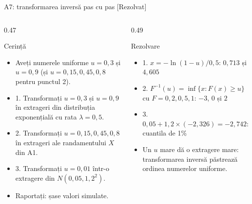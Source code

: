 \begin{frame}{A7: transformarea inversă pas cu pas [Rezolvat]}
\itemsize{\footnotesize}
\begin{columns}[T]
\begin{column}{0.47\textwidth}
\begin{block}{Cerință}
\begin{itemize}
    \item Aveți numerele uniforme $u = 0{,}3$ și $u = 0{,}9$ (și $u = 0{,}15, 0{,}45, 0{,}8$ pentru punctul 2).
    \item 1. Transformați $u = 0{,}3$ și $u = 0{,}9$ în extrageri din distribuția exponențială cu rata $\lambda = 0{,}5$.
    \item 2. Transformați $u = 0{,}15, 0{,}45, 0{,}8$ în extrageri ale randamentului $X$ din A1.
    \item 3. Transformați $u = 0{,}01$ într-o extragere din $N(0{,}05, 1{,}2^2)$.
    \item Raportați: șase valori simulate.
\end{itemize}
\end{block}
\end{column}
\begin{column}{0.49\textwidth}
\begin{exampleblock}{Rezolvare}
\begin{itemize}
    \item 1. $x = -\ln(1 - u)/0{,}5$: $0{,}713$ și $4{,}605$
    \item 2. $F^{-1}(u) = \inf\{x : F(x) \ge u\}$ cu $F = 0{,}2, 0{,}5, 1$: $-3$, $0$ și $2$
    \item 3. $0{,}05 + 1{,}2 \times (-2{,}326) = -2{,}742$: cuantila de 1\%
    \item Un $u$ mare dă o extragere mare: transformarea inversă păstrează ordinea numerelor uniforme.
\end{itemize}
\end{exampleblock}
\end{column}
\end{columns}
\end{frame}

